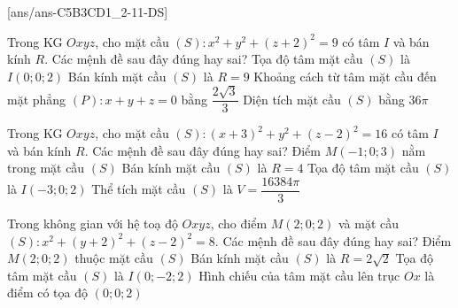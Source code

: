 \TNTF
{}[ans/ans-C5B3CD1_2-11-DS]

\begin{ex}%
	Trong KG $Oxyz$, cho mặt cầu $(S)\colon x^2+y^2+(z+2)^2=9$ có tâm $I$ và bán kính $R$. Các mệnh đề sau đây đúng hay sai?
	\choiceTF
	{Tọa độ tâm mặt cầu $(S)$ là $I(0;0;2)$}
	{Bán kính mặt cầu $(S)$ là $R=9$}
	{\True Khoảng cách từ tâm mặt cầu đến mặt phẳng $(P)\colon x+y+z=0$ bằng $\dfrac{2\sqrt{3}}{3}$}
	{\True Diện tích mặt cầu $(S)$ bằng $36\pi$}
\end{ex}

\begin{ex}%
	Trong KG $Oxyz$, cho mặt cầu $(S)\colon(x+3)^2+y^2+(z-2)^2=16$ có tâm $I$ và bán kính $R$. Các mệnh đề sau đây đúng hay sai?
	\choiceTF
	{\True Điểm $M(-1;0;3)$ nằm trong mặt cầu $(S)$}
	{\True Bán kính mặt cầu $(S)$ là $R=4$}
	{\True Tọa độ tâm mặt cầu $(S)$ là $I(-3;0;2)$}
	{Thể tích mặt cầu $(S)$ là $V=\dfrac{16384\pi}{3}$}
\end{ex}

\begin{ex}%
	Trong không gian với hệ toạ độ $Oxyz$, cho điểm $M(2;0;2)$ và mặt cầu $(S)\colon x^2+(y+2)^2+(z-2)^2=8$. Các mệnh đề sau đây đúng hay sai?
	\choiceTF
	{\True Điểm $M\left(2;0;2\right)$ thuộc mặt cầu $(S)$}
	{\True Bán kính mặt cầu $(S)$ là $R=2\sqrt{2}$}
	{\True Tọa độ tâm mặt cầu $(S)$ là $I\left(0;-2;2\right)$}
	{Hình chiếu của tâm mặt cầu lên trục $Ox$ là điểm có tọa độ $(0;0;2)$}
\end{ex}

